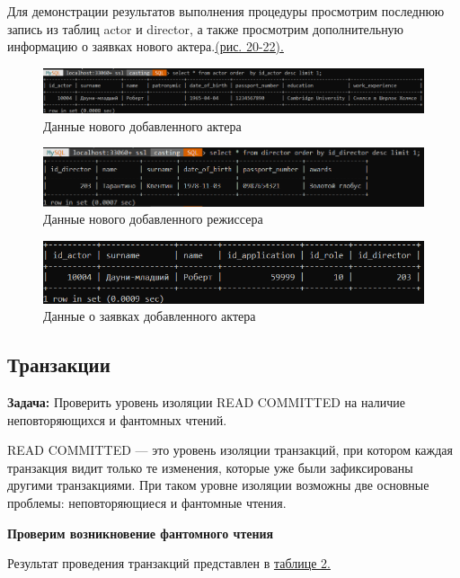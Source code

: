 \documentclass[11pt,a4paper,final]{article} %
\begin{document}
Для демонстрации результатов выполнения процедуры просмотрим последнюю запись из таблиц actor и director, а также просмотрим дополнительную информацию о заявках нового актера.\hyperref[fig:pic20]{(рис. 20-22).}

\begin{figure}[H]
	\centering
	\includegraphics[width=1.0\linewidth]{pic20.png}
	\caption{Данные нового добавленного актера}
	\label{fig:pic20}
\end{figure}

\begin{figure}[H]
	\centering
	\includegraphics[width=1.0\linewidth]{pic21.png}
	\caption{Данные нового добавленного режиссера}
	\label{fig:pic22}
\end{figure}

\newpage
\begin{figure}[H]
	\centering
	\includegraphics[width=1.0\linewidth]{pic22.png}
	\caption{Данные о заявках добавленного актера}
	\label{fig:pic21}
\end{figure}

\subsection{Транзакции}

\textbf{Задача:} Проверить уровень изоляции READ COMMITTED на наличие неповторяющихся и фантомных чтений.

\par READ COMMITTED — это уровень изоляции транзакций, при котором каждая транзакция видит только те изменения, которые уже были зафиксированы другими транзакциями. При таком уровне изоляции возможны две основные проблемы: неповторяющиеся и фантомные чтения. 

\textbf{Проверим возникновение фантомного чтения}
\par Результат проведения транзакций представлен в \hyperref[tab:tb2]{таблице 2.} 
\end{document}
